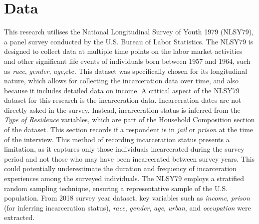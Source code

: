 \documentclass{article}[12pt]
\begin{document}
\section{Data} %
This research utilises the National Longitudinal Survey of Youth 1979 (NLSY79), a panel survey conducted by the U.S. Bureau of Labor Statistics. The NLSY79 is designed to collect data at multiple time points on the labor market activities and other significant life events of individuals born between 1957 and 1964, such as \textit{race}, \textit{gender}, \textit{age},etc. This dataset was specifically chosen for its longitudinal nature, which allows for collecting the incarceration data over time, and also because it includes detailed data on income. A critical aspect of the NLSY79 dataset for this research is the incarceration data. Incarceration dates are not directly asked in the survey. Instead, incarceration status is inferred from the \textit{Type of Residence} variables, which are part of the Household Composition section of the dataset. This section records if a respondent is in \textit{jail} or \textit{prison} at the time of the interview. This method of recording incarceration status presents a limitation, as it captures only those individuals incarcerated during the survey period and not those who may have been incarcerated between survey years. This could potentially underestimate the duration and frequency of incarceration experiences among the surveyed individuals. The NLSY79 employs a stratified random sampling technique, ensuring a representative sample of the U.S. population. From 2018 survey year dataset, key variables such as \textit{income}, \textit{prison} (for inferring incarceration status), \textit{race}, \textit{gender}, \textit{age}, \textit{urban}, and \textit{occupation} were extracted. \par
\end{document}

